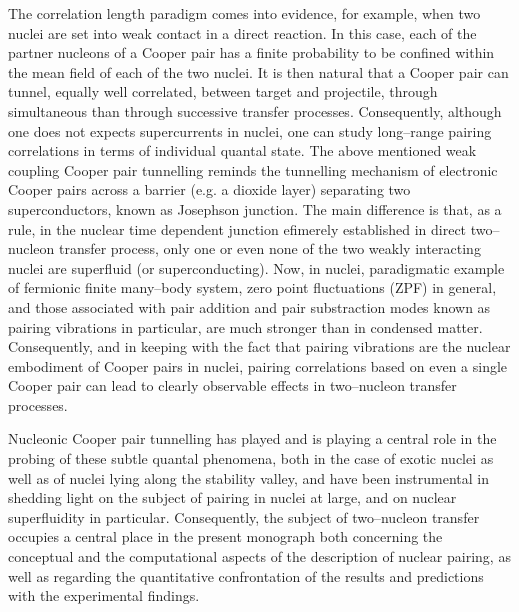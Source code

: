 The correlation length paradigm comes into evidence, for example, when two nuclei are set into weak contact in a direct reaction. In this case, each of the partner nucleons of a Cooper pair has a finite probability to be confined within the mean field of each of the two nuclei. It is then natural that a Cooper pair can tunnel, equally well correlated, between target and projectile, through simultaneous than through successive transfer processes. Consequently, although one does not expects supercurrents in nuclei, one can study long--range pairing correlations in terms of individual quantal state. The above mentioned weak coupling Cooper pair tunnelling reminds  the tunnelling mechanism of electronic Cooper pairs across a barrier (e.g. a dioxide layer) separating two superconductors, known as Josephson junction. The main difference is that, as a rule, in the nuclear time dependent junction efimerely established in  direct two--nucleon transfer process, only one or even none of the two weakly interacting nuclei are superfluid (or superconducting). Now, in nuclei, paradigmatic example of fermionic  finite many--body system, zero point fluctuations  (ZPF) in general, and those associated with pair addition and pair substraction modes known as pairing vibrations in particular, are much stronger than in condensed matter. Consequently, and in keeping with the fact that pairing vibrations are the nuclear embodiment of Cooper pairs in nuclei,   pairing correlations based on even  a single Cooper pair can lead to clearly observable effects in two--nucleon transfer processes. 


 Nucleonic Cooper pair tunnelling has played and is playing a central role in the probing of these subtle quantal phenomena, both in the case of  exotic nuclei as well as of nuclei lying along the stability valley, and have been instrumental in shedding light on the subject of pairing in nuclei at large, and on nuclear superfluidity in particular. Consequently, the subject of two--nucleon transfer occupies  a central place in the present monograph both concerning the conceptual and the computational aspects of the description of nuclear pairing, as well as regarding the quantitative confrontation of the results and predictions with the experimental findings.

